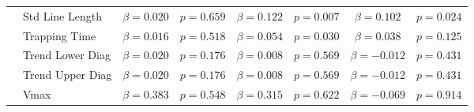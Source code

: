 \begin{tabular}{llcc|cc|cc}
 & Std Line Length & $\beta = 0.020$ & $p = 0.659$ & $\beta = 0.122$ & $p = 0.007$ & $\beta = 0.102$ & $p = 0.024$ \\
 & Trapping Time & $\beta = 0.016$ & $p = 0.518$ & $\beta = 0.054$ & $p = 0.030$ & $\beta = 0.038$ & $p = 0.125$ \\
 & Trend Lower Diag & $\beta = 0.020$ & $p = 0.176$ & $\beta = 0.008$ & $p = 0.569$ & $\beta = -0.012$ & $p = 0.431$ \\
 & Trend Upper Diag & $\beta = 0.020$ & $p = 0.176$ & $\beta = 0.008$ & $p = 0.569$ & $\beta = -0.012$ & $p = 0.431$ \\
 & Vmax & $\beta = 0.383$ & $p = 0.548$ & $\beta = 0.315$ & $p = 0.622$ & $\beta = -0.069$ & $p = 0.914$ \\
\midrule
\bottomrule
\end{tabular}